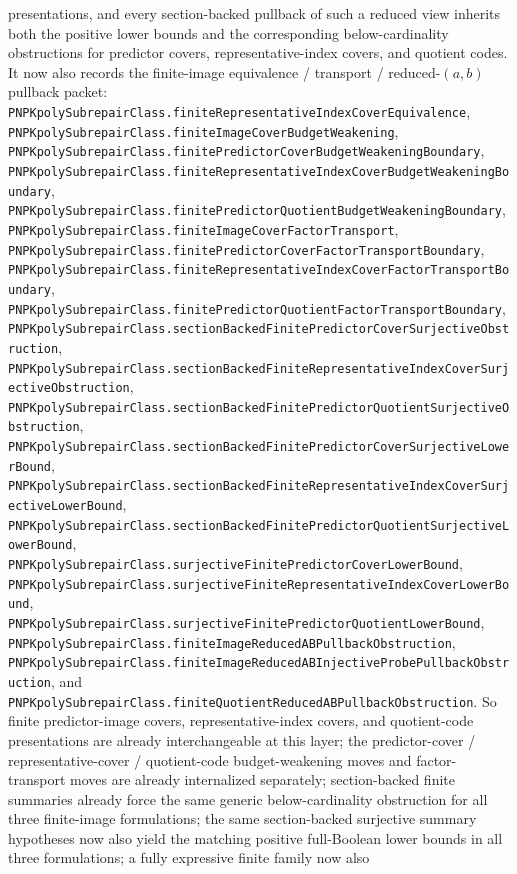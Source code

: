 \documentclass[11pt]{article}
\theoremstyle{remark}
\begin{document}
presentations, and every section-backed pullback of such a reduced view
inherits both the positive lower bounds and the corresponding below-cardinality
obstructions for predictor covers, representative-index covers, and quotient
codes.
It now also records the finite-image equivalence / transport / reduced-\((a,b)\)
pullback packet:
\texttt{PNPKpolySubrepairClass.finiteRepresentativeIndexCoverEquivalence},
\texttt{PNPKpolySubrepairClass.finiteImageCoverBudgetWeakening},
\texttt{PNPKpolySubrepairClass.finitePredictorCoverBudgetWeakeningBoundary},
\texttt{PNPKpolySubrepairClass.finiteRepresentativeIndexCoverBudgetWeakeningBoundary},
\texttt{PNPKpolySubrepairClass.finitePredictorQuotientBudgetWeakeningBoundary},
\texttt{PNPKpolySubrepairClass.finiteImageCoverFactorTransport},
\texttt{PNPKpolySubrepairClass.finitePredictorCoverFactorTransportBoundary},
\texttt{PNPKpolySubrepairClass.finiteRepresentativeIndexCoverFactorTransportBoundary},
\texttt{PNPKpolySubrepairClass.finitePredictorQuotientFactorTransportBoundary},
\texttt{PNPKpolySubrepairClass.sectionBackedFinitePredictorCoverSurjectiveObstruction},
\texttt{PNPKpolySubrepairClass.sectionBackedFiniteRepresentativeIndexCoverSurjectiveObstruction},
\texttt{PNPKpolySubrepairClass.sectionBackedFinitePredictorQuotientSurjectiveObstruction},
\texttt{PNPKpolySubrepairClass.sectionBackedFinitePredictorCoverSurjectiveLowerBound},
\texttt{PNPKpolySubrepairClass.sectionBackedFiniteRepresentativeIndexCoverSurjectiveLowerBound},
\texttt{PNPKpolySubrepairClass.sectionBackedFinitePredictorQuotientSurjectiveLowerBound},
\texttt{PNPKpolySubrepairClass.surjectiveFinitePredictorCoverLowerBound},
\texttt{PNPKpolySubrepairClass.surjectiveFiniteRepresentativeIndexCoverLowerBound},
\texttt{PNPKpolySubrepairClass.surjectiveFinitePredictorQuotientLowerBound},
\texttt{PNPKpolySubrepairClass.finiteImageReducedABPullbackObstruction},
\texttt{PNPKpolySubrepairClass.finiteImageReducedABInjectiveProbePullbackObstruction},
and
\texttt{PNPKpolySubrepairClass.finiteQuotientReducedABPullbackObstruction}.
So finite predictor-image covers, representative-index covers, and
quotient-code presentations are already interchangeable at this layer; the
predictor-cover / representative-cover / quotient-code budget-weakening moves
and factor-transport moves are already internalized separately; section-backed
finite summaries already force the same generic below-cardinality obstruction
for all three finite-image formulations; the same section-backed surjective
summary hypotheses now also yield the matching positive full-Boolean lower
bounds in all three formulations; a fully expressive finite family now also
\end{document}
